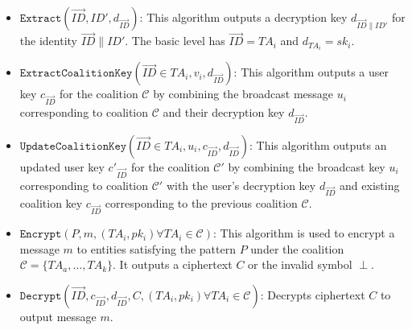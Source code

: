 \documentclass[10pt]{llncs}
\newcommand{\C}{\mathcal{C}}
\newcommand{\ID}{\mathit{ID}}
\newcommand{\TA}{\mathit{TA}}
\begin{document}
\begin{itemize}
\item $\texttt{Extract}(\vec{ID},\ID',d_{\vec{\ID}})$: This algorithm outputs a decryption key $d_{\vec{\ID}\|\ID'}$ for the identity $\vec{\ID} \| \ID'$. The basic level has $\vec{\ID}=\TA_i$ and $d_{\TA_i}= sk_i$.
\medskip

\item $\texttt{ExtractCoalitionKey}(\vec{\ID} \in \TA_i, v_i, d_{\vec{\ID}})$: This algorithm outputs a user key $c_{\vec{\ID}}$ for the coalition $\C$ by combining the broadcast message $u_i$ corresponding to coalition $\C$ and their decryption key $d_{\vec{\ID}}$.
\medskip

\item $\texttt{UpdateCoalitionKey}(\vec{\ID} \in \TA_i, u_i , c_{\vec{\ID}}, d_{\vec{\ID}})$: This algorithm outputs an updated user key $c'_{\vec{\ID}}$ for the coalition $\C'$ by combining the broadcast key $u_i$ corresponding to coalition $\C'$ with the user's decryption key $d_{\vec{\ID}}$ and existing coalition key $c_{\vec{\ID}}$ corresponding to the previous coalition $\C$.
\medskip

\item $\texttt{Encrypt}(\mathit{P}, m, (\TA_i,pk_i) \forall \TA_i \in \C)$: This algorithm is used to encrypt a message $m$ to entities satisfying the pattern $\mathit{P}$ under the coalition $\C = \{\TA_a,\ldots,\TA_k\}$. It outputs a ciphertext $C$ or the invalid symbol $\perp$.
\medskip

\item $\texttt{Decrypt}(\vec{\ID}, c_{\vec{\ID}}, d_{\vec{\ID}}, C, (\TA_i,pk_i) \forall \TA_i \in \C)$: Decrypts ciphertext $C$ to output message $m$.
\end{itemize}
\end{document}
